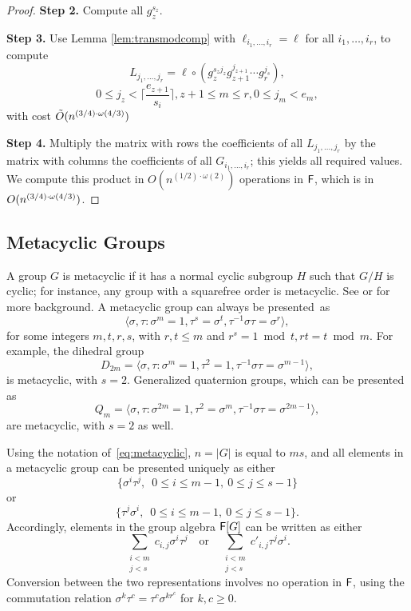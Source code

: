 \begin{proof}
\smallskip\noindent\textbf{Step 2.} Compute all $g_z^{s_z}$.

\smallskip\noindent\textbf{Step 3.} Use Lemma \ref{lem:transmodcomp}
with $\ell_{i_1,\dots,i_r} = \ell$ for all $i_1,\dots,i_r$, to compute 
$$L_{j_1,\dots,j_r} = \ell \circ (g_{z}^{s_z j_z}
g_{z+1}^{j_{z+1}}\cdots g_r^{j_s}),$$
$$
0 \leq j_{z} <  \Big\lceil \frac{e_{z+1}}{s_i} \Big\rceil , z+1\leq m \leq r, 0 \leq j_m < e_m,$$
with cost $\tilde{O}(n^{(3/4)\cdot \omega(4/3)})$

\smallskip\noindent\textbf{Step 4.} Multiply the matrix with rows the
coefficients of all $L_{j_1,\dots,j_r}$ by the matrix with columns the
coefficients of all $G_{i_1,\dots,i_r}$; this yields all required
values. We compute this product in $O(n^{(1/2)\cdot\omega(2)})$
operations in ${\mathsf{F}}$, which is in $O(n^{(3/4)\cdot \omega(4/3)})$.
\end{proof}


\subsection{Metacyclic Groups}

A group $G$ is metacyclic if it has a normal cyclic subgroup $H$ such that
$G/H$ is cyclic; for instance, any group with a squarefree order is
metacyclic. See \citep[p.~88]{Johnson} or \citep[p.~334]{Curtis} for more
background. A metacyclic group can always be presented~as
\begin{equation}
  \label{eq:metacyclic}
  \langle \sigma,\tau: \sigma^m = 1,  \tau^s = \sigma^t, \tau^{-1}\sigma \tau = \sigma^r \rangle,
\end{equation}
for some integers $m,t,r,s$, with $r,t \leq m$ and
$r^s = 1 \bmod t, rt = t \bmod m$. For example, the dihedral group
$$D_{2m} = \langle \sigma,\tau: \sigma^m =1, \tau^2 = 1, \tau^{-1}
\sigma \tau = \sigma^{m-1} \rangle, $$ is metacyclic, with
$s=2$. Generalized quaternion groups, which can be presented as
$$Q_m = \langle \sigma,\tau: \sigma^{2m} =1, \tau^2 = \sigma^m,
\tau^{-1} \sigma \tau = \sigma^{2m-1} \rangle,$$ are metacyclic, with
$s=2$ as well.

Using the notation of~\eqref{eq:metacyclic}, $n=|G|$ is equal to $ms$, and
all elements in a metacyclic group can be presented uniquely as either
\begin{equation}\label{pres1}
\{\sigma^i \tau^j,\,\,\, 0\leq i \leq m-1,\ 0\leq j \leq s-1\}  
\end{equation}
or
\begin{equation}\label{pres2}
\{ \tau^j\sigma^i,\,\,\, 0\leq i \leq m-1,\ 0\leq j \leq s-1\}.
\end{equation}
Accordingly, elements in the group algebra ${\mathsf{F}}[G]$ can be written as 
either 
$$\sum_{\substack{i <m\\ j< s}} c_{i,j} \sigma^i \tau^j \quad\text{or}\quad
\sum_{\substack{i <m\\ j< s}} c'_{i,j} \tau^j \sigma^i.$$
Conversion between the two representations involves no operation in ${\mathsf{F}}$,
using the commutation relation $\sigma^k \tau^c = \tau^c \sigma^{kr^c}$
for $k,c \ge 0$.

